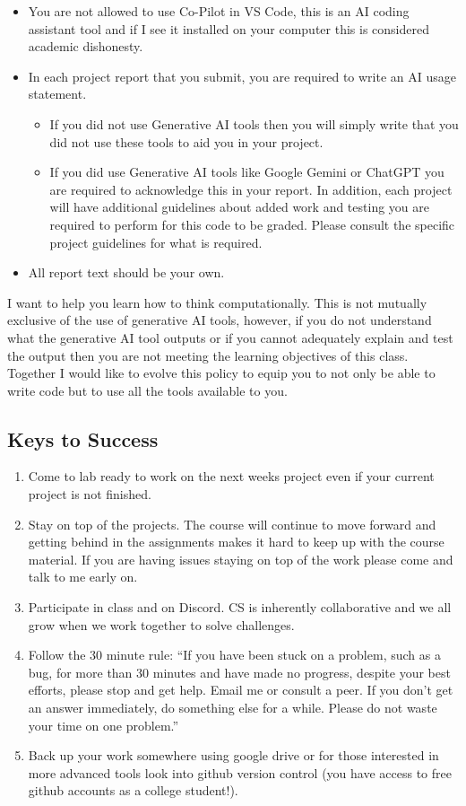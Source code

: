 \documentclass[12pt]{article}
\begin{document}
\begin{itemize}
\item You are not allowed to use Co-Pilot in VS Code, this is an AI coding assistant tool and if I see it installed on your computer this is considered academic dishonesty.
\item In each project report that you submit, you are required to write an AI usage statement. 
  \begin{itemize}
    \item   If you did not use Generative AI tools then you will simply write that you did not use these tools to aid you in your project. 
    \item If you did use Generative AI tools like Google Gemini or ChatGPT you are required to acknowledge this in your report. In addition, each project will have additional guidelines about added work and testing you are required to perform for this code to be graded. Please consult the specific project guidelines for what is required.   
  \end{itemize}
\item All report text should be your own.
\end{itemize}

I want to help you learn how to think computationally.
This is not mutually exclusive of the use of generative AI tools, however, if you do not understand what the generative AI tool outputs or if you cannot adequately explain and test the output then you are not meeting the learning objectives of this class.
Together I would like to evolve this policy to equip you to not only be able to write code but to use all the tools available to you.

\subsection{Keys to Success}
\begin{enumerate}
\item Come to lab ready to work on the next weeks project even if your current project is not finished.
  \item Stay on top of the projects. The course will continue to move forward and getting behind in the assignments makes it hard to keep up with the course material. If you are having issues staying on top of the work please come and talk to me early on. 
\item Participate in class and on Discord. CS is inherently collaborative and we all grow when we work together to solve challenges.
\item Follow the 30 minute rule: ``If you have been stuck on a problem, such as a bug, for more than 30 minutes and have made no progress, despite your best efforts, please stop and get help. Email me  or consult a peer. If you don't get an answer immediately, do something else for a while. Please do not waste your time on one problem.''
\item Back up your work somewhere using google drive or for those interested in more advanced tools look into github version control (you have access to free github accounts as a college student!).
\end{enumerate}
\end{document}
